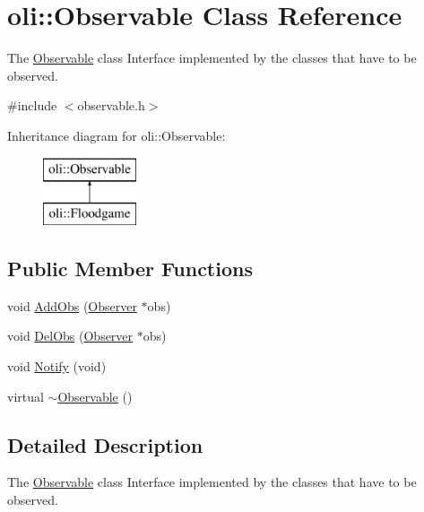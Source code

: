 \hypertarget{classoli_1_1_observable}{}\section{oli\+:\+:Observable Class Reference}
\label{classoli_1_1_observable}


The \hyperlink{classoli_1_1_observable}{Observable} class Interface implemented by the classes that have to be observed.  




{\ttfamily \#include $<$observable.\+h$>$}

Inheritance diagram for oli\+:\+:Observable\+:\begin{figure}[H]
\begin{center}
\leavevmode
\includegraphics[height=2.000000cm]{classoli_1_1_observable}
\end{center}
\end{figure}
\subsection*{Public Member Functions}
\begin{DoxyCompactItemize}
\item 
void \hyperlink{classoli_1_1_observable_af746a8f49e2b08bc93767281dd813532}{Add\+Obs} (\hyperlink{classoli_1_1_observer}{Observer} $\ast$obs)
\item 
void \hyperlink{classoli_1_1_observable_a9fb13016d9b81c1132171b581e243d8b}{Del\+Obs} (\hyperlink{classoli_1_1_observer}{Observer} $\ast$obs)
\item 
void \hyperlink{classoli_1_1_observable_ab1fe0a40f7aaa9d9acee97f8c08ec328}{Notify} (void)
\item 
virtual \hyperlink{classoli_1_1_observable_aabeb2ecf331c7ecb274594df6f4e82b1}{$\sim$\+Observable} ()
\end{DoxyCompactItemize}


\subsection{Detailed Description}
The \hyperlink{classoli_1_1_observable}{Observable} class Interface implemented by the classes that have to be observed. 

